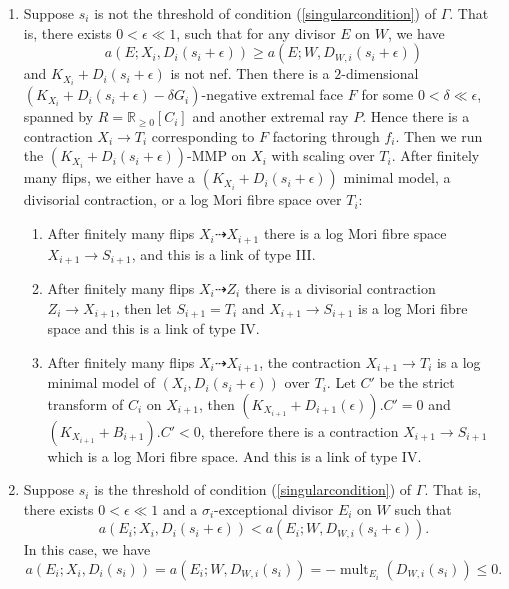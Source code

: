 \documentclass[11pt]{amsart}
\begin{document}
\begin{enumerate}
  \item\label{2a} Suppose $s_{i}$ is not the threshold of  condition (\ref{singularcondition}) of $\Gamma$. That is, there exists $0<\epsilon\ll 1$, such that for any divisor $E$ on $W$, we have
    \[
      a(E;X_{i},D_{i}(s_{i}+\epsilon))\geqslant a(E;W,D_{W,i}(s_{i}+\epsilon))
    \]
    and $K_{X_{i}}+D_{i}(s_{i}+\epsilon)$ is not nef. Then there is a $2$-dimensional $(K_{X_{i}}+D_{i}(s_{i}+\epsilon)-\delta G_{i})$-negative extremal face $F$ for some $0< \delta \ll \epsilon $, spanned by $R=\mathbb{R}_{\geqslant 0}[C_{i}]$ and another extremal ray $P$. Hence there is a contraction $X_{i}\to T_{i}$ corresponding to $F$ factoring through $f_{i}$. Then we run the $(K_{X_{i}}+D_{i}(s_{i}+\epsilon))$-MMP on $X_{i}$ with scaling over $T_{i}$. After finitely many flips, we either have a $(K_{X_{i}}+D_{i}(s_{i}+\epsilon))$ minimal model, a divisorial contraction, or a log Mori fibre space over $T_{i}$: 
    \begin{enumerate}
    \item\label{2a1}After finitely many flips $X_{i}\dashrightarrow X_{i+1}$ there is a log Mori fibre space $X_{i+1}\to S_{i+1}$, and this is a link of type III.
    \item\label{2a2} After finitely many flips $X_{i}\dashrightarrow Z_{i}$ there is a divisorial contraction $Z_{i}\to X_{i+1}$, then let $S_{i+1}=T_{i}$ and $X_{i+1}\to S_{i+1}$ is a log Mori fibre space and this is a link of type IV.
    \item \label{2a3}After finitely many flips $X_{i}\dashrightarrow X_{i+1}$,  the contraction $X_{i+1}\to T_{i}$ is a log minimal model of $\left(X_{i},D_{i}\left(s_{i}+\epsilon\right)\right)$ over $T_{i}$. Let  $C'$ be the strict transform of  $C_{i}$ on $X_{i+1}$, then $(K_{X_{i+1}}+D_{i+1}(\epsilon)).C'=0$ and $(K_{X_{i+1}}+B_{i+1}).C'<0$, therefore there is a contraction  $X_{i+1} \to S_{i+1}$ which is a log Mori fibre space. And this is a link of type IV. 
  \end{enumerate}
\item\label{2b} Suppose $s_{i}$ is the threshold of condition (\ref{singularcondition}) of $\Gamma$. That is, there exists  $0<\epsilon \ll 1$ and a $\sigma_{i}$-exceptional divisor $E_{i}$ on $W$ such that 
    \[
      a(E_{i};X_{i},D_{i}(s_{i}+\epsilon))< a(E_{i};W,D_{W,i}(s_{i}+\epsilon))
    .\]
   In this case, we have 
    \[
  a(E_{i};X_{i},D_{i}(s_{i}))= a(E_{i};W,D_{W,i}(s_{i}))=-\operatorname{mult}_{E_{i}}(D_{W,i}(s_{i}))\leqslant 0
    .\]


\end{enumerate}
\end{document}
